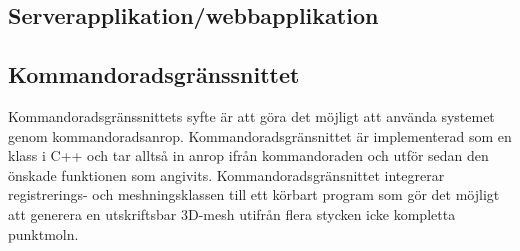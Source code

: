 \documentclass[a4paper,titlepage,12pt]{article}
\begin{document}
	\subsection{Serverapplikation/webbapplikation}
	
	\subsection{Kommandoradsgränssnittet}
		Kommandoradsgränssnittets syfte är att göra det möjligt att använda systemet genom kommandoradsanrop. Kommandoradsgränsnittet är implementerad som en klass i C++ och tar alltså in anrop ifrån kommandoraden och utför sedan den önskade funktionen som angivits. Kommandoradsgränsnittet integrerar registrerings- och meshningsklassen till ett körbart program som gör det möjligt att generera en utskriftsbar 3D-mesh utifrån flera stycken icke kompletta punktmoln.
	
\newpage
\end{document}
